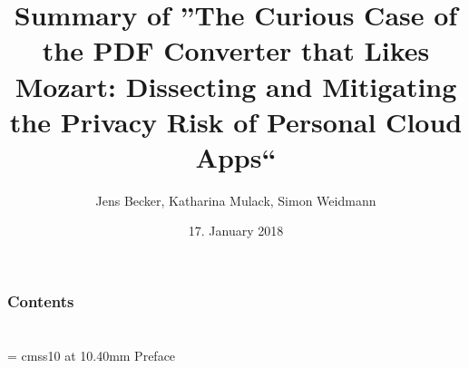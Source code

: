 \documentclass{beamer}
\title{Summary of ''The Curious Case of the PDF
Converter that Likes Mozart: Dissecting and Mitigating the Privacy Risk of Personal Cloud Apps``} %
\author{Jens Becker, Katharina Mulack, Simon Weidmann}
\institute{Security of complex Information systems}
\date{17. January 2018}
\begin{document}
{
\section*{}
\frame{\titlepage}
}

{
\section*{}
	\begin{frame}
	\frametitle{Contents}
      \tableofcontents    
\end{frame}
}

{
\section*{}
	\begin{frame}
      \begin{center}
        \font\endfont = cmss10 at 10.40mm
        \color{darkBlue}
        \endfont 
        \baselineskip 20.0mm   
        Preface 
      \end{center}    
\end{frame}
}
\end{document}
